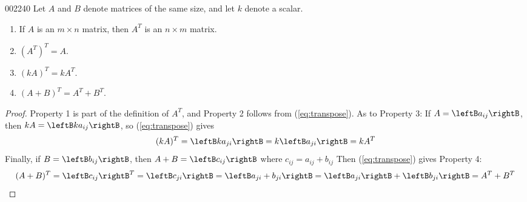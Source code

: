 \begin{theorem}{}{002240}
Let $A$ and $B$ denote matrices of the same size, and let $k$ denote a scalar.


\begin{enumerate}
\item If $A$ is an $m \times n$ matrix, then $A^{T}$ is an $n \times m$ matrix.

\item $(A^{T})^{T} = A$.

\item $(kA)^{T} = kA^{T}$.

\item $(A + B)^{T} = A^{T} + B^{T}$.

\end{enumerate}
\end{theorem}

\begin{proof}
Property 1 is part of the definition of $A^{T}$, and Property 2 follows from (\ref{eq:transpose}). As to Property 3: If $A = \leftB a_{ij} \rightB$, then $kA = \leftB ka_{ij} \rightB$, so (\ref{eq:transpose}) gives
\begin{equation*}
(kA)^{T} = \leftB ka_{ji} \rightB = k \leftB a_{ji} \rightB = kA^{T}
\end{equation*}
Finally, if $B = \leftB b_{ij} \rightB$, then $A + B = \leftB c_{ij} \rightB$ where $c_{ij} = a_{ij} + b_{ij}$ Then (\ref{eq:transpose}) gives Property 4:
\begin{equation*}
(A + B)^{T} = \leftB c_{ij} \rightB^{T} = \leftB c_{ji} \rightB = \leftB a_{ji} + b_{ji} \rightB = \leftB a_{ji} \rightB + \leftB b_{ji} \rightB = A^{T} + B^{T}
\end{equation*}
\end{proof}

